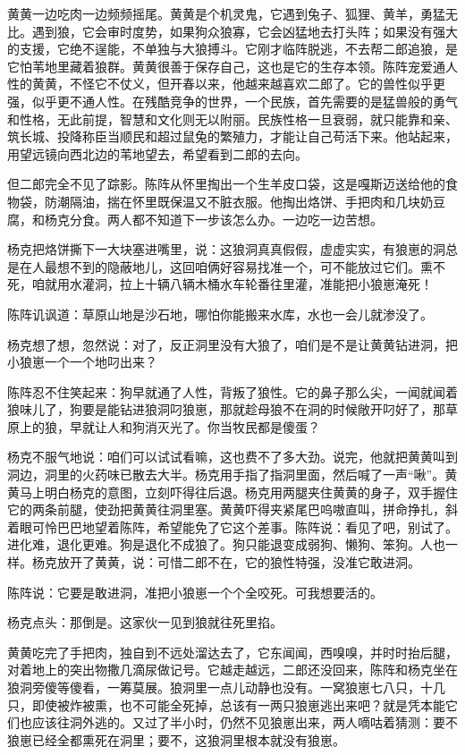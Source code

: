 \par 黄黄一边吃肉一边频频摇尾。黄黄是个机灵鬼，它遇到兔子、狐狸、黄羊，勇猛无比。遇到狼，它会审时度势，如果狗众狼寡，它会凶猛地去打头阵；如果没有强大的支援，它绝不逞能，不单独与大狼搏斗。它刚才临阵脱逃，不去帮二郎追狼，是它怕苇地里藏着狼群。黄黄很善于保存自己，这也是它的生存本领。陈阵宠爱通人性的黄黄，不怪它不仗义，但开春以来，他越来越喜欢二郎了。它的兽性似乎更强，似乎更不通人性。在残酷竞争的世界，一个民族，首先需要的是猛兽般的勇气和性格，无此前提，智慧和文化则无以附丽。民族性格一旦衰弱，就只能靠和亲、筑长城、投降称臣当顺民和超过鼠兔的繁殖力，才能让自己苟活下来。他站起来，用望远镜向西北边的苇地望去，希望看到二郎的去向。
\par 但二郎完全不见了踪影。陈阵从怀里掏出一个生羊皮口袋，这是嘎斯迈送给他的食物袋，防潮隔油，揣在怀里既保温又不脏衣服。他掏出烙饼、手把肉和几块奶豆腐，和杨克分食。两人都不知道下一步该怎么办。一边吃一边苦想。
\par 杨克把烙饼撕下一大块塞进嘴里，说：这狼洞真真假假，虚虚实实，有狼崽的洞总是在人最想不到的隐蔽地儿，这回咱俩好容易找准一个，可不能放过它们。熏不死，咱就用水灌洞，拉上十辆八辆木桶水车轮番往里灌，准能把小狼崽淹死！
\par 陈阵讥讽道：草原山地是沙石地，哪怕你能搬来水库，水也一会儿就渗没了。
\par 杨克想了想，忽然说：对了，反正洞里没有大狼了，咱们是不是让黄黄钻进洞，把小狼崽一个一个地叼出来？
\par 陈阵忍不住笑起来：狗早就通了人性，背叛了狼性。它的鼻子那么尖，一闻就闻着狼味儿了，狗要是能钻进狼洞叼狼崽，那就趁母狼不在洞的时候敞开叼好了，那草原上的狼，早就让人和狗消灭光了。你当牧民都是傻蛋？
\par 杨克不服气地说：咱们可以试试看嘛，这也费不了多大劲。说完，他就把黄黄叫到洞边，洞里的火药味已散去大半。杨克用手指了指洞里面，然后喊了一声“啾”。黄黄马上明白杨克的意图，立刻吓得往后退。杨克用两腿夹住黄黄的身子，双手握住它的两条前腿，使劲把黄黄往洞里塞。黄黄吓得夹紧尾巴呜嗷直叫，拼命挣扎，斜着眼可怜巴巴地望着陈阵，希望能免了它这个差事。陈阵说：看见了吧，别试了。进化难，退化更难。狗是退化不成狼了。狗只能退变成弱狗、懒狗、笨狗。人也一样。杨克放开了黄黄，说：可惜二郎不在，它的狼性特强，没准它敢进洞。
\par 陈阵说：它要是敢进洞，准把小狼崽一个个全咬死。可我想要活的。
\par 杨克点头：那倒是。这家伙一见到狼就往死里掐。
\par 黄黄吃完了手把肉，独自到不远处溜达去了，它东闻闻，西嗅嗅，并时时抬后腿，对着地上的突出物撒几滴尿做记号。它越走越远，二郎还没回来，陈阵和杨克坐在狼洞旁傻等傻看，一筹莫展。狼洞里一点儿动静也没有。一窝狼崽七八只，十几只，即使被炸被熏，也不可能全死掉，总该有一两只狼崽逃出来吧？就是凭本能它们也应该往洞外逃的。又过了半小时，仍然不见狼崽出来，两人嘀咕着猜测：要不狼崽已经全都熏死在洞里；要不，这狼洞里根本就没有狼崽。
